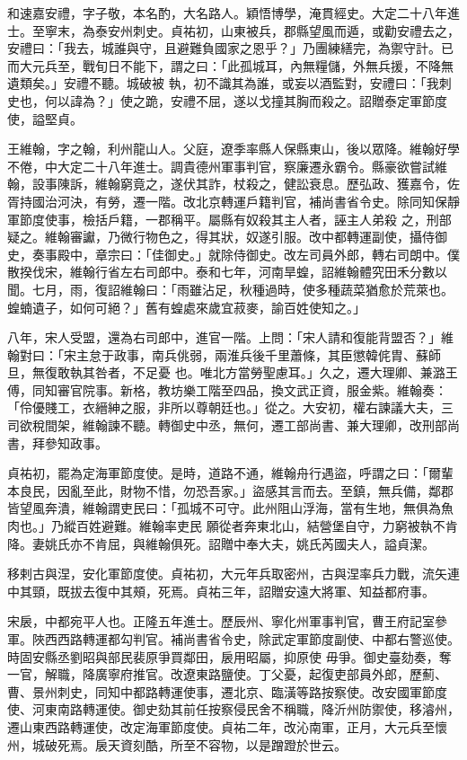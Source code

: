 \begin{pinyinscope}
 和速嘉安禮，字子敬，本名酌，大名路人。穎悟博學，淹貫經史。大定二十八年進士。至寧末，為泰安州刺史。貞祐初，山東被兵，郡縣望風而遁，或勸安禮去之，安禮曰：「我去，城誰與守，且避難負國家之恩乎？」乃團練繕完，為禦守計。已而大元兵至，戰旬日不能下，謂之曰：「此孤城耳，內無糧儲，外無兵援，不降無遺類矣。」安禮不聽。城破被
 執，初不識其為誰，或妄以酒監對，安禮曰：「我刺史也，何以諱為？」使之跪，安禮不屈，遂以戈撞其胸而殺之。詔贈泰定軍節度使，謚堅貞。



 王維翰，字之翰，利州龍山人。父庭，遼季率縣人保縣東山，後以眾降。維翰好學不倦，中大定二十八年進士。調貴德州軍事判官，察廉遷永霸令。縣豪欲嘗試維翰，設事陳訴，維翰窮竟之，遂伏其詐，杖殺之，健訟衰息。歷弘政、獲嘉令，佐胥持國治河決，有勞，遷一階。改北京轉運戶籍判官，補尚書省令史。除同知保靜軍節度使事，檢括戶籍，一郡稱平。屬縣有奴殺其主人者，誣主人弟殺
 之，刑部疑之。維翰審讞，乃微行物色之，得其狀，奴遂引服。改中都轉運副使，攝侍御史，奏事殿中，章宗曰：「佳御史。」就除侍御史。改左司員外郎，轉右司朗中。僕散揆伐宋，維翰行省左右司郎中。泰和七年，河南旱蝗，詔維翰體究田禾分數以聞。七月，雨，復詔維翰曰：「雨雖沾足，秋種過時，使多種蔬菜猶愈於荒萊也。蝗蝻遺子，如何可絕？」舊有蝗處來歲宜菽麥，諭百姓使知之。」



 八年，宋人受盟，還為右司郎中，進官一階。上問：「宋人請和復能背盟否？」維翰對曰：「宋主怠于政事，南兵佻弱，兩淮兵後千里蕭條，其臣懲韓侂胄、蘇師旦，無復敢執其咎者，不足憂
 也。唯北方當勞聖慮耳。」久之，遷大理卿、兼潞王傅，同知審官院事。新格，教坊樂工階至四品，換文武正資，服金紫。維翰奏：「伶優賤工，衣縉紳之服，非所以尊朝廷也。」從之。大安初，權右諫議大夫，三司欲稅間架，維翰諫不聽。轉御史中丞，無何，遷工部尚書、兼大理卿，改刑部尚書，拜參知政事。



 貞祐初，罷為定海軍節度使。是時，道路不通，維翰舟行遇盜，呼謂之曰：「爾輩本良民，因亂至此，財物不惜，勿恐吾家。」盜感其言而去。至鎮，無兵備，鄰郡皆望風奔潰，維翰謂吏民曰：「孤城不可守。此州阻山浮海，當有生地，無俱為魚肉也。」乃縱百姓避難。維翰率吏民
 願從者奔東北山，結營堡自守，力窮被執不肯降。妻姚氏亦不肯屈，與維翰俱死。詔贈中奉大夫，姚氏芮國夫人，謚貞潔。



 移剌古與涅，安化軍節度使。貞祐初，大元年兵取密州，古與涅率兵力戰，流矢連中其頸，既拔去復中其頰，死焉。貞祐三年，詔贈安遠大將軍、知益都府事。



 宋扆，中都宛平人也。正隆五年進士。歷辰州、寧化州軍事判官，曹王府記室參軍。陜西西路轉運都勾判官。補尚書省令史，除武定軍節度副使、中都右警巡使。時固安縣丞劉昭與部民裴原爭買鄰田，扆用昭屬，抑原使
 毋爭。御史臺劾奏，奪一官，解職，降廣寧府推官。改遼東路鹽使。丁父憂，起復吏部員外郎，歷薊、曹、景州刺史，同知中都路轉運使事，遷北京、臨潢等路按察使。改安國軍節度使、河東南路轉運使。御史劾其前任按察侵民舍不稱職，降沂州防禦使，移濬州，遷山東西路轉運使，改定海軍節度使。貞祐二年，改沁南軍，正月，大元兵至懷州，城破死焉。扆天資刻酷，所至不容物，以是蹭蹬於世云。




\end{pinyinscope}
